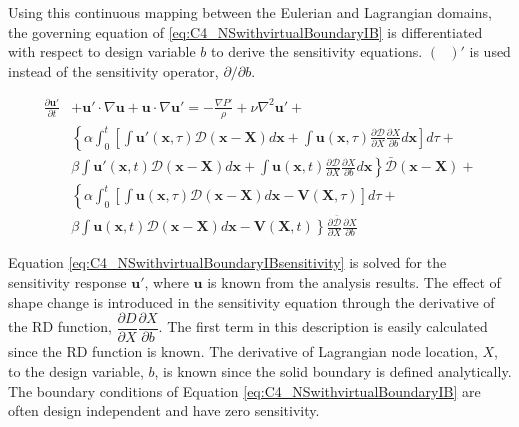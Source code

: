 Using this continuous mapping between the Eulerian and Lagrangian domains, the governing equation of \eqref{eq:C4_NSwithvirtualBoundaryIB} is differentiated with respect to design variable $b$ to derive the sensitivity equations. $(\text{ })'$ is used instead of the sensitivity operator, $\partial/\partial b$.

\begin{align}\label{eq:C4_NSwithvirtualBoundaryIBsensitivity}
    \frac{\partial \mathbf{u}'}{\partial t} &+ 
    \mathbf{u}' \cdot \nabla \mathbf{u} +
    \mathbf{u} \cdot \nabla \mathbf{u}' = 
    -\frac{\nabla P'}{\rho} + 
    \nu \nabla^2 \mathbf{u}' + \nonumber \\
    &\left\{
    \alpha
    \int_0^t
    \left[
        \int \mathbf{u}'(\mathbf{x}, \tau) \mathcal{D}(\mathbf{x} - \mathbf{X}) d\mathbf{x} + 
        \int \mathbf{u}(\mathbf{x}, \tau) \frac{\partial \mathcal{D}}{\partial X} \frac{\partial X}{\partial b} d\mathbf{x}
    \right] d\tau \right.
    + \nonumber \\
    &
    \left.
    \beta
    \int \mathbf{u}'(\mathbf{x}, t) \mathcal{D}(\mathbf{x} - \mathbf{X}) d\mathbf{x} +
    \int \mathbf{u}(\mathbf{x}, t) \frac{\partial \mathcal{D}}{\partial X} \frac{\partial X}{\partial b} d\mathbf{x}
    \right\} \bar{\mathcal{D}}(\mathbf{x} - \mathbf{X}) + \nonumber \\
    &\left\{
    \alpha
    \int_0^t
    \left[
        \int \mathbf{u}(\mathbf{x}, \tau) \mathcal{D}(\mathbf{x} - \mathbf{X}) d\mathbf{x} - \mathbf{V}(\mathbf{X}, \tau)
    \right] d\tau \right.
    + \nonumber \\
    &
    \left.
    \beta
    \int \mathbf{u}(\mathbf{x}, t) \mathcal{D}(\mathbf{x} - \mathbf{X}) d\mathbf{x} - \mathbf{V}(\mathbf{X}, t)
    \right\}
    \frac{\partial \bar{\mathcal{D}}}{\partial X} \frac{\partial X}{\partial b}
\end{align}

Equation \eqref{eq:C4_NSwithvirtualBoundaryIBsensitivity} is solved for the sensitivity response $\mathbf{u}'$, where $\mathbf{u}$ is known from the analysis results. The effect of shape change is introduced in the sensitivity equation through the derivative of the RD function, $\dfrac{\partial D}{\partial X} \dfrac{\partial X}{\partial b}$. The first term in this description is easily calculated since the RD function is known. The derivative of Lagrangian node location, $X$, to the design variable, $b$, is known since the solid boundary is defined analytically. The boundary conditions of Equation \eqref{eq:C4_NSwithvirtualBoundaryIB} are often design independent and have zero sensitivity.

